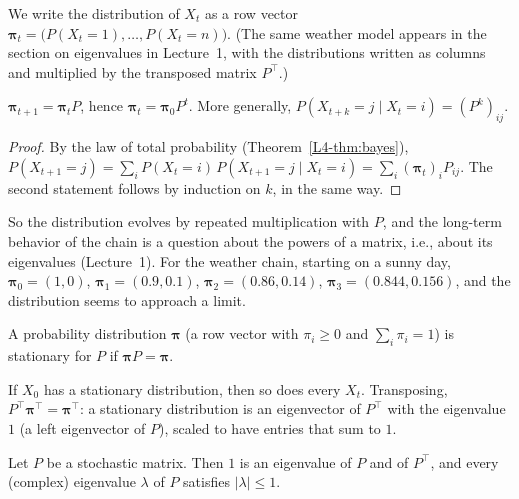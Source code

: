 We write the distribution of $X_t$ as a row vector $\boldsymbol{\pi}_t = \big(P(X_t = 1), \ldots, P(X_t = n)\big)$. (The same weather model appears in the section on eigenvalues in Lecture~1, with the distributions written as columns and multiplied by the transposed matrix $P^\top$.)

\begin{proposition}\label{L4-prop:markov-evolution}
    $\boldsymbol{\pi}_{t+1} = \boldsymbol{\pi}_t P$, hence $\boldsymbol{\pi}_t = \boldsymbol{\pi}_0 P^t$. More generally, $P(X_{t+k} = j \mid X_t = i) = (P^k)_{ij}$.
\end{proposition}

\begin{proof}
    By the law of total probability (Theorem~\ref{L4-thm:bayes}), $P(X_{t+1} = j) = \sum_i P(X_t = i)\,P(X_{t+1} = j \mid X_t = i) = \sum_i (\boldsymbol{\pi}_t)_i P_{ij}$. The second statement follows by induction on $k$, in the same way.
\end{proof}

So the distribution evolves by repeated multiplication with $P$, and the long-term behavior of the chain is a question about the powers of a matrix, i.e., about its eigenvalues (Lecture~1). For the weather chain, starting on a sunny day, $\boldsymbol{\pi}_0 = (1, 0)$, $\boldsymbol{\pi}_1 = (0.9, 0.1)$, $\boldsymbol{\pi}_2 = (0.86, 0.14)$, $\boldsymbol{\pi}_3 = (0.844, 0.156)$, and the distribution seems to approach a limit.

\begin{definition}\label{L4-def:stationary}
    A probability distribution $\boldsymbol{\pi}$ (a row vector with $\pi_i \geq 0$ and $\sum_i \pi_i = 1$) is stationary for $P$ if $\boldsymbol{\pi}P = \boldsymbol{\pi}$.
\end{definition}

If $X_0$ has a stationary distribution, then so does every $X_t$. Transposing, $P^\top\boldsymbol{\pi}^\top = \boldsymbol{\pi}^\top$: a stationary distribution is an eigenvector of $P^\top$ with the eigenvalue $1$ (a left eigenvector of $P$), scaled to have entries that sum to $1$.

\begin{proposition}\label{L4-prop:stochastic-eigenvalues}
    Let $P$ be a stochastic matrix. Then $1$ is an eigenvalue of $P$ and of $P^\top$, and every (complex) eigenvalue $\lambda$ of $P$ satisfies $|\lambda| \leq 1$.
\end{proposition}

